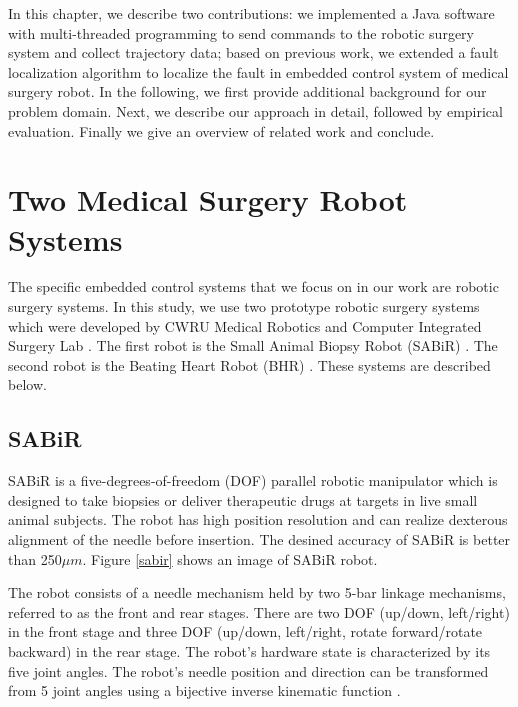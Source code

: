 In this chapter, we describe two contributions: we implemented a Java software with multi-threaded programming to send commands to the robotic surgery system and collect trajectory data; based on previous work, we extended a fault localization algorithm to localize the fault in embedded control system of medical surgery robot. In the following, we first provide additional background for our problem domain. Next, we describe our approach in detail, followed by empirical evaluation. Finally we give an overview of related work and conclude.

\section{Two Medical Surgery Robot Systems }\label{secrobot}
The specific embedded control systems that we focus on in our work are robotic surgery systems. In this study, we use two prototype robotic surgery systems which were developed by CWRU Medical Robotics and Computer Integrated Surgery Lab \cite{MeRCIS}. The first robot is the Small Animal Biopsy Robot (SABiR) \cite{bebek2008design}. The second robot is the Beating Heart Robot (BHR) \cite{bebek2007whisker, bebek2006model}. These systems are described below.

\subsection {SABiR}
SABiR is a five-degrees-of-freedom (DOF) parallel robotic manipulator which is designed to take biopsies or deliver therapeutic drugs at targets in live small animal subjects. The robot has high position resolution and can realize dexterous alignment of  the needle before insertion. The desined accuracy of SABiR is better than 250${\mu}m$. Figure \ref{sabir} shows an image of SABiR robot. 

The robot consists of a needle mechanism held by two 5-bar linkage mechanisms, referred to as the front and rear stages. There are two DOF (up/down, left/right) in the front stage and three DOF (up/down, left/right, rotate forward/rotate backward) in the rear stage. The robot’s hardware state is characterized by its five joint angles. The robot’s needle position and direction can be transformed from 5 joint angles using a bijective inverse kinematic function \cite{bebek2008design}.

